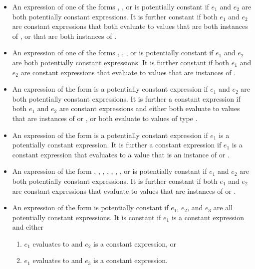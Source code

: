 \documentclass[makeidx]{article}
\begin{document}
\begin{itemize}
\item An expression of one of the forms , , or  is potentially constant if $e_1$ and $e_2$ are both potentially constant expressions. It is further constant if both $e_1$ and $e_2$ are constant expressions that both evaluate to values that are both instances of , or that are both instances of .

\item An expression of one of the forms , , , or  is potentially constant if $e_1$ and $e_2$ are both potentially constant expressions. It is further constant if both $e_1$ and $e_2$ are constant expressions that evaluate to values that are instances of .

\item An expression of the form  is a potentially constant expression if $e_1$ and $e_2$ are both potentially constant expressions. It is further a constant expression if both $e_1$ and $e_2$ are constant expressions and either both evaluate to values that are instances of  or , or both evaluate to values of type .

\item An expression of the form  is a potentially constant expression if $e_1$ is a potentially constant expression. It is further a constant expression if $e_1$ is a constant expression that evaluates to a value that is an instance of  or .

\item An expression of the form , , , , , , , or  is potentially constant if $e_1$ and $e_2$ are both potentially constant expressions. It is further constant if both $e_1$ and $e_2$ are constant expressions that evaluate to values that are instances of  or .

\item An expression of the form  is potentially constant if $e_1$, $e_2$, and $e_3$ are all potentially constant expressions. It is constant if $e_1$ is a constant expression and either
\begin{enumerate}
\item $e_1$ evaluates to \TRUE{} and $e_2$ is a constant expression, or
\item $e_1$ evaluates to \FALSE{} and $e_3$ is a constant expression.
\end{enumerate}


\end{itemize}
\end{document}
